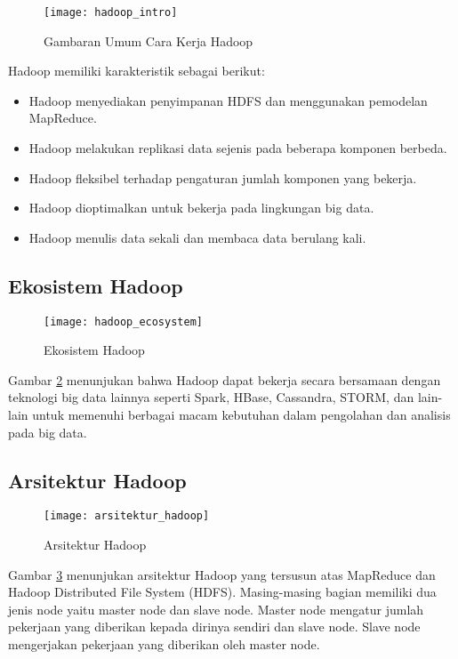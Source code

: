\begin{figure}[H]
	\centering
	\texttt{[image: hadoop\_intro]}
	\caption{Gambaran Umum Cara Kerja Hadoop}
	\label{fig:hadoop_intro}
\end{figure}

\noindent Hadoop memiliki karakteristik sebagai berikut:
\begin{itemize}
\item Hadoop menyediakan penyimpanan HDFS dan menggunakan pemodelan MapReduce.
\item Hadoop melakukan replikasi data sejenis pada beberapa komponen berbeda. 
\item Hadoop fleksibel terhadap pengaturan jumlah komponen yang bekerja.
\item Hadoop dioptimalkan untuk bekerja pada lingkungan big data.
\item Hadoop menulis data sekali dan membaca data berulang kali.

\end{itemize}

\subsection{Ekosistem Hadoop}
\begin{figure}[H]
	\centering
	\texttt{[image: hadoop\_ecosystem]}
	\caption{Ekosistem Hadoop}
	\label{fig:hadoop_ecosystem}
\end{figure}
Gambar \ref{fig:hadoop_ecosystem} menunjukan bahwa Hadoop dapat bekerja secara bersamaan dengan teknologi big data lainnya seperti Spark, HBase, Cassandra, STORM, dan lain-lain untuk memenuhi berbagai macam kebutuhan dalam pengolahan dan analisis pada big data.

\subsection{Arsitektur Hadoop}
\begin{figure}[H]
	\centering
	\texttt{[image: arsitektur\_hadoop]}
	\caption{Arsitektur Hadoop}
	\label{fig:arsitektur_hadoop}
\end{figure}
Gambar \ref{fig:arsitektur_hadoop} menunjukan arsitektur Hadoop yang tersusun atas MapReduce dan Hadoop Distributed File System (HDFS). Masing-masing bagian memiliki dua jenis node yaitu master node dan slave node. Master node mengatur jumlah pekerjaan yang diberikan kepada dirinya sendiri dan slave node. Slave node mengerjakan pekerjaan yang diberikan oleh master node.


